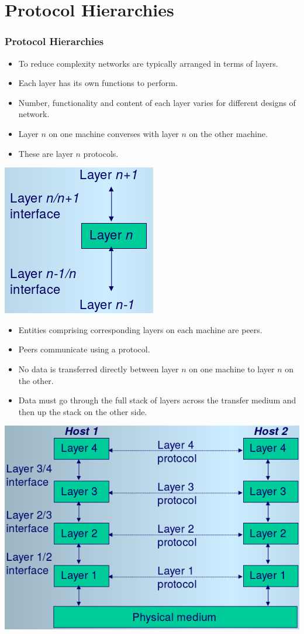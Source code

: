 \documentclass{beamer}
\begin{document}
\section{Protocol Hierarchies}
\begin{frame}[allowframebreaks]
\frametitle{Protocol Hierarchies}
\begin{itemize}
\item To reduce {\color{red} complexity} networks are typically arranged in terms of layers.
\item Each layer has its own functions to perform.
\item Number, functionality and content of each layer varies for different designs of network.
\item Layer $n$ on one machine converses with layer $n$ on the other machine.
\item These are {\color{green}layer $n$ protocols}.
\end{itemize}
\includegraphics[scale=0.4]{lay.png}
\begin{itemize}
\item Entities comprising corresponding layers on each machine are {\color{purple}peers}. 
\item {\color{purple}Peers} communicate using a {\color{orange}protocol}.
\item No data is transferred directly between layer $n$ on one machine to layer $n$ on the other.
\item Data must go through the full stack of layers across the transfer medium and then up the stack on the other side.
\end{itemize}
\includegraphics[scale=0.3]{flayer.png}

\end{frame}
\end{document}
